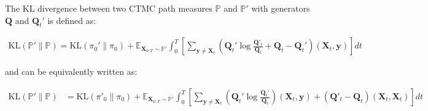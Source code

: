 \documentclass{article}
\begin{document}
\begin{corollary}\label{corollary:ctmc-kl}
    The KL divergence between two CTMC path measures $\mathbb{P}$ and $\mathbb{P}'$ with generators $\boldsymbol{Q}$ and $\boldsymbol{Q}_t'$ is defined as:
    \begin{small}
    \begin{align}
        \text{KL}(\mathbb{P}'\|\mathbb{P})=\text{KL}(\pi_0'\|\pi_0)+\mathbb{E}_{\boldsymbol{X}_{0:T}\sim \mathbb{P}'}\int_0^T\left[\sum_{\boldsymbol{y}\neq \boldsymbol{X}_t}\left(\boldsymbol{Q}_t'\log \frac{\boldsymbol{Q}'_t}{\boldsymbol{Q}_t}+\boldsymbol{Q}_t-\boldsymbol{Q}_t'\right)(\boldsymbol{X}_t,\boldsymbol{y})\right]dt\label{eq:kl-ctmc-1}
    \end{align}
    \end{small}
    and can be equivalently written as:
    \begin{small}
    \begin{align}
        \text{KL}(\mathbb{P}'\|\mathbb{P})
        &=\text{KL}(\pi'_0\|\pi_0)+\mathbb{E}_{\boldsymbol{X}_{0:T}\sim \mathbb{P}'}\int_0^T\left[\sum_{\boldsymbol{y}\neq \boldsymbol{X}_t}\left(\boldsymbol{Q}_t'\log \frac{\boldsymbol{Q}_{t}'}{\boldsymbol{Q}_{t}}\right)(\boldsymbol{X}_t, \boldsymbol{y})+(\boldsymbol{Q}'_t-\boldsymbol{Q}_t)(\boldsymbol{X}_t,\boldsymbol{X}_t)\right]dt\label{eq:kl-ctmc-2}
    \end{align}
    \end{small}
\end{corollary}
\end{document}
